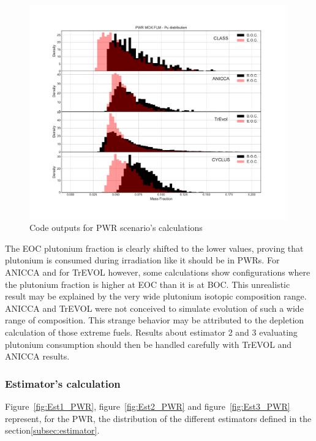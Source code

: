 \begin{figure}[h]
	\begin{center}
		\includegraphics[width = 0.99\textwidth]{../../Feature_1/RAW_DATA/FIG/PWR_MOX_FLM_Pu.pdf}
		\caption{Code outputs for \gls{PWR} scenario's calculations}
		\label{fig:PWR_MOX_FLM_Pu}
	\end{center}
\end{figure}

The \gls{EOC} plutonium fraction is clearly shifted to the lower values, proving that
plutonium is consumed during irradiation like it should be in \gls{PWR}s. For ANICCA
and for TrEVOL however, some calculations show configurations where the
plutonium fraction is higher at \gls{EOC} than it is at \gls{BOC}. This unrealistic
result may be explained by the very wide plutonium isotopic composition range.
ANICCA and TrEVOL were not conceived to simulate evolution of such a wide range
of composition. This strange behavior may be attributed to the depletion
calculation of those extreme fuels. Results about estimator 2 and 3 evaluating
plutonium consumption should then be handled carefully with TrEVOL and ANICCA
results.   


\subsubsection{Estimator's calculation}

Figure~\ref{fig:Est1_PWR}, figure~\ref{fig:Est2_PWR} and
figure~\ref{fig:Est3_PWR} represent, for the \gls{PWR}, the distribution of the
different estimators defined in the section\ref{subsec:estimator}. 

